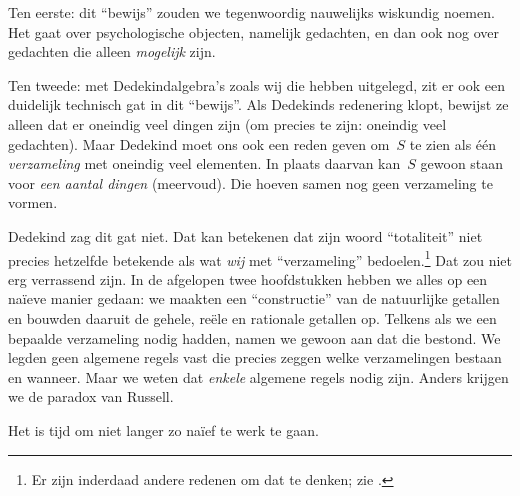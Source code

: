 \documentclass[../../../include/open-logic-section]{subfiles}
\begin{document}
Ten eerste: dit ``bewijs'' zouden we tegenwoordig nauwelijks wiskundig
noemen. Het gaat over psychologische objecten, namelijk gedachten, en
dan ook nog over gedachten die alleen \emph{mogelijk} zijn.

Ten tweede: met Dedekindalgebra's zoals wij die hebben uitgelegd, zit er
ook een duidelijk technisch gat in dit ``bewijs''. Als Dedekinds
redenering klopt, bewijst ze alleen dat er oneindig veel dingen zijn
(om precies te zijn: oneindig veel gedachten). Maar Dedekind moet ons
ook een reden geven om~$S$ te zien als één \emph{verzameling} met
oneindig veel elementen. In plaats daarvan kan~$S$ gewoon staan voor
\emph{een aantal dingen} (meervoud). Die hoeven samen nog geen
verzameling te vormen.

Dedekind zag dit gat niet. Dat kan betekenen dat zijn woord
``totaliteit'' niet precies hetzelfde betekende als wat \emph{wij} met
``verzameling'' bedoelen.\footnote{Er zijn inderdaad andere redenen om
dat te denken; zie \citet[p.~23]{Potter2004}.} Dat zou niet erg
verrassend zijn. In de afgelopen twee hoofdstukken hebben we alles op
een na\"ieve manier gedaan: we maakten een ``constructie'' van de
natuurlijke getallen en bouwden daaruit de gehele, reële en rationale
getallen op. Telkens als we een bepaalde verzameling nodig hadden,
namen we gewoon aan dat die bestond. We legden geen algemene regels
vast die precies zeggen welke verzamelingen bestaan en wanneer. Maar we
weten dat \emph{enkele} algemene regels nodig zijn. Anders krijgen we
de paradox van Russell.

Het is tijd om niet langer zo na\"ief te werk te gaan.
\end{document}
